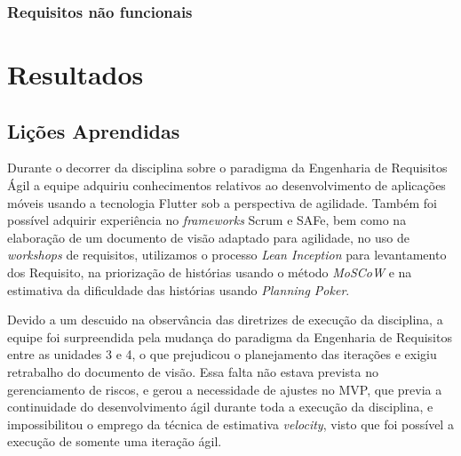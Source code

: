 \documentclass[
	12pt,				%
	oneside,			%
	a4paper,			%
	english,			%
	brazil,				%
	]{abntex2}
\begin{document}
\section{Requisitos não funcionais}
\begin{table}[ht]
\end{table}

\part{Resultados}
\chapter{Lições Aprendidas}
Durante o decorrer da disciplina sobre o paradigma da Engenharia de Requisitos Ágil a equipe adquiriu conhecimentos relativos ao desenvolvimento de aplicações móveis usando a tecnologia Flutter sob a perspectiva de agilidade. Também foi possível adquirir experiência no \textit{frameworks} Scrum e SAFe, bem como na elaboração de um documento de visão adaptado para agilidade, no uso de \textit{workshops} de requisitos, utilizamos o processo  \textit{Lean Inception} para levantamento dos Requisito, na priorização de histórias usando o método \textit{MoSCoW} e na estimativa da dificuldade das histórias usando \textit{Planning Poker}.

Devido a um descuido na observância das diretrizes de execução da disciplina, a equipe foi surpreendida pela mudança do paradigma da Engenharia de Requisitos entre as unidades 3 e 4, o que prejudicou o planejamento das iterações e exigiu retrabalho do documento de visão. Essa falta não estava prevista no gerenciamento de riscos, e gerou a necessidade de ajustes no MVP, que previa a continuidade do desenvolvimento ágil durante toda a execução da disciplina, e impossibilitou o emprego da técnica de estimativa \textit{velocity}, visto que foi possível a execução de somente uma iteração ágil.
\end{document}
